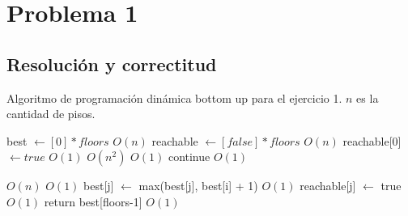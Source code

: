 \documentclass{article}
\theoremstyle{definition}
\theoremstyle{remark}
\begin{document}
{} %

\subtitulo{}
\grupo{}

 
\maketitle

\pagebreak

\tableofcontents

\pagebreak


\section{Problema 1}

\subsection{Resolución y correctitud}

\begin{algorithm}[h!]
\caption{Algoritmo de programación dinámica bottom up para el ejercicio 1. $n$ es la cantidad de pisos.\label{alg:ex1}}

\begin{algorithmic}[h!]
\State best $\gets [0] * floors$ \Comment $O(n)$
\State reachable $\gets [false] * floors$ \Comment $O(n)$
\State reachable[0] $\gets true$ \Comment $O(1)$
 \Comment $O(n^2)$
     \Comment $O(1)$
        \State continue \Comment $O(1)$
    \EndIf
    
     \Comment $O(n)$
         \Comment $O(1)$
            \State best[j] $\gets$ max(best[j], best[i] + 1) \Comment $O(1)$
            \State reachable[j] $\gets$ true \Comment $O(1)$
        \EndIf    
    \EndFor
\EndFor
\State return best[floors-1] \Comment $O(1)$
\EndProcedure\\
\end{algorithmic}
\end{algorithm}
\end{document}
